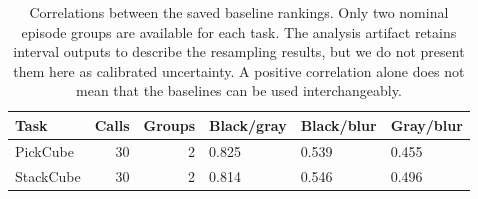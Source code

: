 \begin{table}[htbp]
\centering\small
\setlength{\tabcolsep}{3.5pt}
\caption{Correlations between the saved baseline rankings. Only two nominal episode groups are available for each task. The analysis artifact retains interval outputs to describe the resampling results, but we do not present them here as calibrated uncertainty. A positive correlation alone does not mean that the baselines can be used interchangeably.}
\label{tab:baseline}
\begin{tabular}{lrrlll}
\toprule
Task & Calls & Groups & Black/gray & Black/blur & Gray/blur \\
\midrule
PickCube & 30 & 2 & 0.825 & 0.539 & 0.455 \\
StackCube & 30 & 2 & 0.814 & 0.546 & 0.496 \\
\bottomrule
\end{tabular}
\end{table}
